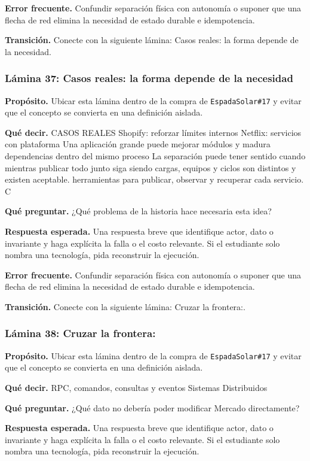 \documentclass[variant=docente,cover=institutional,mode=screen]{ua-engineering-v6-article}
\begin{document}
\textbf{Error frecuente.} Confundir separación física con autonomía o suponer que una flecha de red elimina la necesidad de estado durable e idempotencia.

\textbf{Transición.} Conecte con la siguiente lámina: Casos reales: la forma depende de la necesidad.

\subsubsection*{Lámina 37: Casos reales: la forma depende de la necesidad}
\textbf{Propósito.} Ubicar esta lámina dentro de la compra de \texttt{EspadaSolar\#17} y evitar que el concepto se convierta en una definición aislada.

\textbf{Qué decir.} CASOS REALES Shopify: reforzar límites internos Netflix: servicios con plataforma Una aplicación grande puede mejorar módulos y madura dependencias dentro del mismo proceso La separación puede tener sentido cuando mientras publicar todo junto siga siendo cargas, equipos y ciclos son distintos y existen aceptable. herramientas para publicar, observar y recuperar cada servicio. C

\textbf{Qué preguntar.} ¿Qué problema de la historia hace necesaria esta idea?

\textbf{Respuesta esperada.} Una respuesta breve que identifique actor, dato o invariante y haga explícita la falla o el costo relevante. Si el estudiante solo nombra una tecnología, pida reconstruir la ejecución.

\textbf{Error frecuente.} Confundir separación física con autonomía o suponer que una flecha de red elimina la necesidad de estado durable e idempotencia.

\textbf{Transición.} Conecte con la siguiente lámina: Cruzar la frontera:.

\subsubsection*{Lámina 38: Cruzar la frontera:}
\textbf{Propósito.} Ubicar esta lámina dentro de la compra de \texttt{EspadaSolar\#17} y evitar que el concepto se convierta en una definición aislada.

\textbf{Qué decir.} RPC, comandos, consultas y eventos Sistemas Distribuidos

\textbf{Qué preguntar.} ¿Qué dato no debería poder modificar Mercado directamente?

\textbf{Respuesta esperada.} Una respuesta breve que identifique actor, dato o invariante y haga explícita la falla o el costo relevante. Si el estudiante solo nombra una tecnología, pida reconstruir la ejecución.
\end{document}

